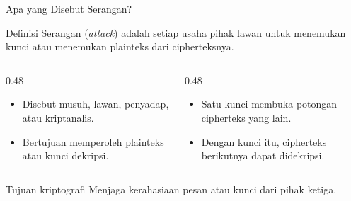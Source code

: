 \documentclass[aspectratio=169,11pt]{beamer}
\begin{document}
\begin{frame}{Apa yang Disebut Serangan?}
    \begin{block}{Definisi}
        Serangan (\textit{attack}) adalah setiap usaha pihak lawan untuk
        menemukan kunci atau menemukan plainteks dari cipherteksnya.
    \end{block}
    \vspace{0.25cm}
    \begin{columns}[T,onlytextwidth]
        \begin{column}{0.48\textwidth}
            \begin{itemize}
                \item Disebut musuh, lawan, penyadap, atau kriptanalis.
                \item Bertujuan memperoleh plainteks atau kunci dekripsi.
            \end{itemize}
        \end{column}
        \begin{column}{0.48\textwidth}
            \begin{itemize}
                \item Satu kunci membuka potongan cipherteks yang lain.
                \item Dengan kunci itu, cipherteks berikutnya dapat
                      didekripsi.
            \end{itemize}
        \end{column}
    \end{columns}
    \vspace{0.2cm}
    \begin{alertblock}{Tujuan kriptografi}
        Menjaga kerahasiaan pesan atau kunci dari pihak ketiga.
    \end{alertblock}
\end{frame}
\end{document}
